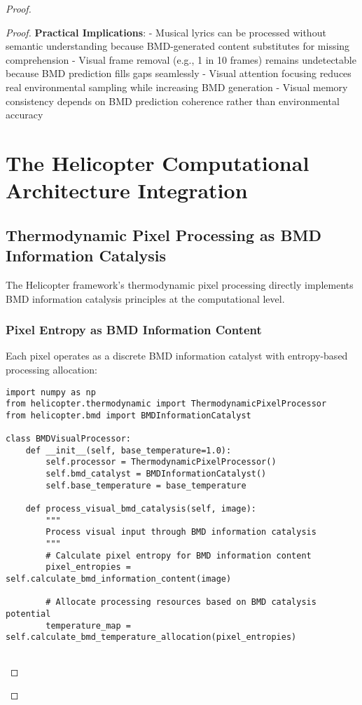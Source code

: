 \documentclass[12pt,a4paper]{article}
\begin{document}
\begin{proof}
{\begin{proof}
\textbf{Practical Implications}:
- Musical lyrics can be processed without semantic understanding because BMD-generated content substitutes for missing comprehension
- Visual frame removal (e.g., 1 in 10 frames) remains undetectable because BMD prediction fills gaps seamlessly
- Visual attention focusing reduces real environmental sampling while increasing BMD generation
- Visual memory consistency depends on BMD prediction coherence rather than environmental accuracy

\section{The Helicopter Computational Architecture Integration}

\subsection{Thermodynamic Pixel Processing as BMD Information Catalysis}

The Helicopter framework's thermodynamic pixel processing directly implements BMD information catalysis principles at the computational level.

\subsubsection{Pixel Entropy as BMD Information Content}

Each pixel operates as a discrete BMD information catalyst with entropy-based processing allocation:

\begin{lstlisting}[style=pythonstyle, caption=BMD Thermodynamic Pixel Processing]
import numpy as np
from helicopter.thermodynamic import ThermodynamicPixelProcessor
from helicopter.bmd import BMDInformationCatalyst

class BMDVisualProcessor:
    def __init__(self, base_temperature=1.0):
        self.processor = ThermodynamicPixelProcessor()
        self.bmd_catalyst = BMDInformationCatalyst()
        self.base_temperature = base_temperature
        
    def process_visual_bmd_catalysis(self, image):
        """
        Process visual input through BMD information catalysis
        """
        # Calculate pixel entropy for BMD information content
        pixel_entropies = self.calculate_bmd_information_content(image)
        
        # Allocate processing resources based on BMD catalysis potential
        temperature_map = self.calculate_bmd_temperature_allocation(pixel_entropies)
        

\end{lstlisting}
\end{proof}}
\end{proof}
\end{document}
